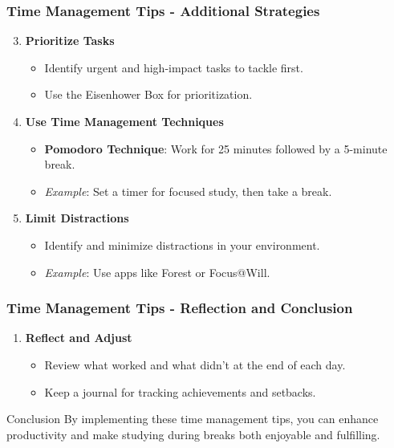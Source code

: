 \documentclass[aspectratio=169]{beamer}
\begin{document}
\begin{frame}[fragile]
    \frametitle{Time Management Tips - Additional Strategies}
    \begin{enumerate}
        \setcounter{enumi}{2}
        \item \textbf{Prioritize Tasks}
            \begin{itemize}
                \item Identify urgent and high-impact tasks to tackle first.
                \item Use the Eisenhower Box for prioritization.
            \end{itemize}

        \item \textbf{Use Time Management Techniques}
            \begin{itemize}
                \item \textbf{Pomodoro Technique}: Work for 25 minutes followed by a 5-minute break.
                \item \textit{Example}: Set a timer for focused study, then take a break.
            \end{itemize}

        \item \textbf{Limit Distractions}
            \begin{itemize}
                \item Identify and minimize distractions in your environment.
                \item \textit{Example}: Use apps like Forest or Focus@Will.
            \end{itemize}
    \end{enumerate}
\end{frame}

\begin{frame}[fragile]
    \frametitle{Time Management Tips - Reflection and Conclusion}
    \begin{enumerate}
        \item \textbf{Reflect and Adjust}
            \begin{itemize}
                \item Review what worked and what didn’t at the end of each day.
                \item Keep a journal for tracking achievements and setbacks.
            \end{itemize}
    \end{enumerate}
    \begin{block}{Conclusion}
        By implementing these time management tips, you can enhance productivity and make studying during breaks both enjoyable and fulfilling.
    \end{block}
\end{frame}
\end{document}
